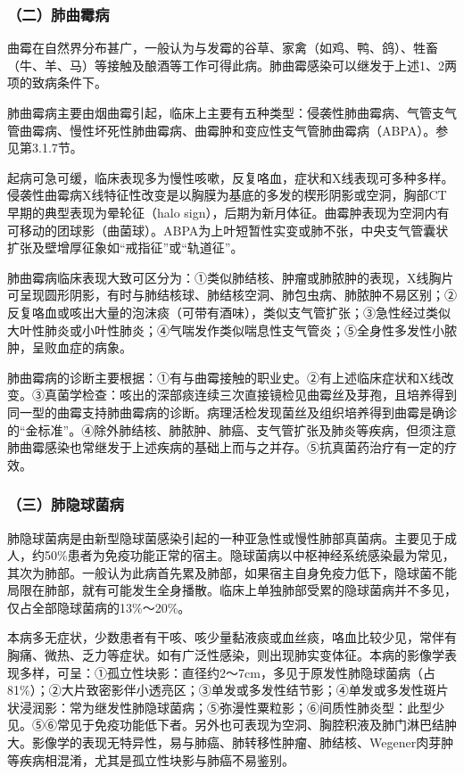 \subsubsection{（二）肺曲霉病}

曲霉在自然界分布甚广，一般认为与发霉的谷草、家禽（如鸡、鸭、鸽）、牲畜（牛、羊、马）等接触及酿酒等工作可得此病。肺曲霉感染可以继发于上述1、2两项的致病条件下。

肺曲霉病主要由烟曲霉引起，临床上主要有五种类型：侵袭性肺曲霉病、气管支气管曲霉病、慢性坏死性肺曲霉病、曲霉肿和变应性支气管肺曲霉病（ABPA）。参见第3.1.7节。

起病可急可缓，临床表现多为慢性咳嗽，反复咯血，症状和X线表现可多种多样。侵袭性曲霉病X线特征性改变是以胸膜为基底的多发的楔形阴影或空洞，胸部CT早期的典型表现为晕轮征（halo
sign），后期为新月体征。曲霉肿表现为空洞内有可移动的团球影（曲菌球）。ABPA为上叶短暂性实变或肺不张，中央支气管囊状扩张及壁增厚征象如“戒指征”或“轨道征”。

肺曲霉病临床表现大致可区分为：①类似肺结核、肿瘤或肺脓肿的表现，X线胸片可呈现圆形阴影，有时与肺结核球、肺结核空洞、肺包虫病、肺脓肿不易区别；②反复咯血或咳出大量的泡沫痰（可带有酒味），类似支气管扩张；③急性经过类似大叶性肺炎或小叶性肺炎；④气喘发作类似喘息性支气管炎；⑤全身性多发性小脓肿，呈败血症的病象。

肺曲霉病的诊断主要根据：①有与曲霉接触的职业史。②有上述临床症状和X线改变。③真菌学检查：咳出的深部痰连续三次直接镜检见曲霉丝及芽孢，且培养得到同一型的曲霉支持肺曲霉病的诊断。病理活检发现菌丝及组织培养得到曲霉是确诊的“金标准”。④除外肺结核、肺脓肿、肺癌、支气管扩张及肺炎等疾病，但须注意肺曲霉感染也常继发于上述疾病的基础上而与之并存。⑤抗真菌药治疗有一定的疗效。

\subsubsection{（三）肺隐球菌病}

肺隐球菌病是由新型隐球菌感染引起的一种亚急性或慢性肺部真菌病。主要见于成人，约50\%患者为免疫功能正常的宿主。隐球菌病以中枢神经系统感染最为常见，其次为肺部。一般认为此病首先累及肺部，如果宿主自身免疫力低下，隐球菌不能局限在肺部，就有可能发生全身播散。临床上单独肺部受累的隐球菌病并不多见，仅占全部隐球菌病的13\%～20\%。

本病多无症状，少数患者有干咳、咳少量黏液痰或血丝痰，咯血比较少见，常伴有胸痛、微热、乏力等症状。如有广泛性感染，则出现肺实变体征。本病的影像学表现多样，可呈：①孤立性块影：直径约2～7cm，多见于原发性肺隐球菌病（占81\%）；②大片致密影伴小透亮区；③单发或多发性结节影；④单发或多发性斑片状浸润影：常为继发性肺隐球菌病；⑤弥漫性粟粒影；⑥间质性肺炎型：此型少见。⑤⑥常见于免疫功能低下者。另外也可表现为空洞、胸腔积液及肺门淋巴结肿大。影像学的表现无特异性，易与肺癌、肺转移性肿瘤、肺结核、Wegener肉芽肿等疾病相混淆，尤其是孤立性块影与肺癌不易鉴别。


